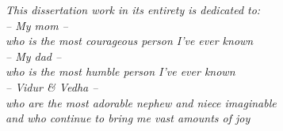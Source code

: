 \begin{center}
\vspace*{4.5cm}
\emph{This dissertation work in its entirety is dedicated to:\\ -- My mom -- \\ who is the most courageous person I've ever known\\ -- My dad -- \\ who is the most humble person I've ever known\\ -- Vidur \& Vedha -- \\ who are the most adorable nephew and niece imaginable\\ and who continue to bring me vast amounts of joy}
\end{center}
